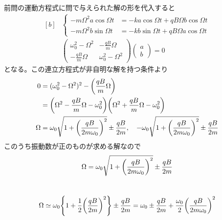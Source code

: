 \documentclass[../ap_2011.tex]{subfiles}
\begin{document}
\section{}
前問の運動方程式に問で与えられた解の形を代入すると
\begin{equation}\begin{aligned}[b]
    &\begin{cases}
        -m\Omega^2 a\cos\Omega t &= -ka\cos\Omega t + qB\Omega b\cos\Omega t\\
        -m\Omega^2 b\sin\Omega t &= -kb\sin\Omega t + qB\Omega a\cos\Omega t
    \end{cases}\\
    &\begin{pmatrix}
        \omega_0^2-\Omega^2 & -\frac{qB}{m}\Omega\\
        -\frac{qB}{m}\Omega & \omega_0^2-\Omega^2
    \end{pmatrix}\begin{pmatrix}
        a\\b
    \end{pmatrix}=0
\end{aligned}\end{equation}
となる。この連立方程式が非自明な解を持つ条件より
\begin{equation}\begin{aligned}[b]
    0 &= (\omega_0^2-\Omega^2)^2-\qty(\frac{qB}{m}\Omega)\\
    &= \qty(\Omega^2-\frac{qB}{m}\Omega -\omega_0^2)\qty(\Omega^2+\frac{qB}{m}\Omega -\omega_0^2)\\
    \Omega &= \omega_0\sqrt{1+\qty(\frac{qB}{2m\omega_0})^2}\pm\frac{qB}{2m},\quad -\omega_0\sqrt{1+\qty(\frac{qB}{2m\omega_0})^2}\pm\frac{qB}{2m}
\end{aligned}\end{equation}
このうち振動数が正のものが求める解なので
\begin{equation}\begin{aligned}[b]
    \Omega = \omega_0\sqrt{1+\qty(\frac{qB}{2m\omega_0})^2}\pm\frac{qB}{2m}
\end{aligned}\end{equation}

\section{}
\begin{equation}\begin{aligned}[b]
    \Omega \simeq \omega_0\qty{1+\frac{1}{2}\qty(\frac{qB}{2m})^2}\pm\frac{qB}{2m}
    =\omega_0 \pm\frac{qB}{2m} +\frac{\omega_0}{2}\qty(\frac{qB}{2m\omega_0})^2
\end{aligned}\end{equation}
\end{document}
